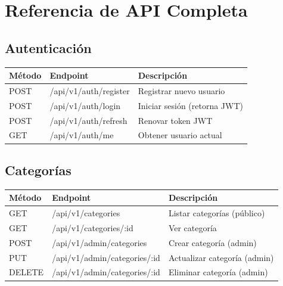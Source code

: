 \documentclass[12pt,a4paper]{article}
\begin{document}
\newpage

\section{Referencia de API Completa}

\subsection{Autenticación}
\begin{tabular}{|l|l|p{6cm}|}
\hline
\textbf{Método} & \textbf{Endpoint} & \textbf{Descripción} \\
\hline
POST & /api/v1/auth/register & Registrar nuevo usuario \\
POST & /api/v1/auth/login & Iniciar sesión (retorna JWT) \\
POST & /api/v1/auth/refresh & Renovar token JWT \\
GET & /api/v1/auth/me & Obtener usuario actual \\
\end{tabular}

\subsection{Categorías}
\begin{tabular}{|l|l|p{6cm}|}
\hline
\textbf{Método} & \textbf{Endpoint} & \textbf{Descripción} \\
\hline
GET & /api/v1/categories & Listar categorías (público) \\
GET & /api/v1/categories/:id & Ver categoría \\
POST & /api/v1/admin/categories & Crear categoría (admin) \\
PUT & /api/v1/admin/categories/:id & Actualizar categoría (admin) \\
DELETE & /api/v1/admin/categories/:id & Eliminar categoría (admin) \\
\end{tabular}
\end{document}
